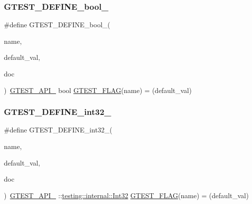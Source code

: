 \mbox{\label{googletest-master_2googletest_2include_2gtest_2internal_2gtest-port_8h_a48e05814779e5a2f432b06a12618a760}} 
\subsubsection{\texorpdfstring{GTEST\_DEFINE\_bool\_}{GTEST\_DEFINE\_bool\_}}
{\footnotesize\ttfamily \#define G\+T\+E\+S\+T\+\_\+\+D\+E\+F\+I\+N\+E\+\_\+bool\+\_\+(\begin{DoxyParamCaption}\item[{}]{name,  }\item[{}]{default\+\_\+val,  }\item[{}]{doc }\end{DoxyParamCaption})~\mbox{\hyperlink{_obj__test_2lib_2googletest-release-1_88_81_2googletest_2include_2gtest_2internal_2gtest-port_8h_aa73be6f0ba4a7456180a94904ce17790}{G\+T\+E\+S\+T\+\_\+\+A\+P\+I\+\_\+}} bool \mbox{\hyperlink{_obj__test_2lib_2googletest-release-1_88_81_2googletest_2include_2gtest_2internal_2gtest-port_8h_a828f4e34a1c4b510da50ec1563e3562a}{G\+T\+E\+S\+T\+\_\+\+F\+L\+AG}}(name) = (default\+\_\+val)}

\mbox{\label{googletest-master_2googletest_2include_2gtest_2internal_2gtest-port_8h_a88ee2f19589ffff86ca742fd33611358}} 
\subsubsection{\texorpdfstring{GTEST\_DEFINE\_int32\_}{GTEST\_DEFINE\_int32\_}}
{\footnotesize\ttfamily \#define G\+T\+E\+S\+T\+\_\+\+D\+E\+F\+I\+N\+E\+\_\+int32\+\_\+(\begin{DoxyParamCaption}\item[{}]{name,  }\item[{}]{default\+\_\+val,  }\item[{}]{doc }\end{DoxyParamCaption})~\mbox{\hyperlink{_obj__test_2lib_2googletest-release-1_88_81_2googletest_2include_2gtest_2internal_2gtest-port_8h_aa73be6f0ba4a7456180a94904ce17790}{G\+T\+E\+S\+T\+\_\+\+A\+P\+I\+\_\+}} \+::\mbox{\hyperlink{namespacetesting_1_1internal_af89e21e4043b5cf0c120af487b24fa06}{testing\+::internal\+::\+Int32}} \mbox{\hyperlink{_obj__test_2lib_2googletest-release-1_88_81_2googletest_2include_2gtest_2internal_2gtest-port_8h_a828f4e34a1c4b510da50ec1563e3562a}{G\+T\+E\+S\+T\+\_\+\+F\+L\+AG}}(name) = (default\+\_\+val)}

